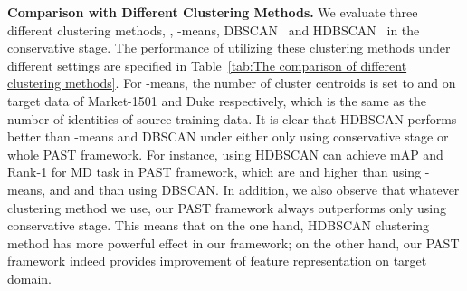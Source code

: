 \documentclass[10pt,twocolumn,letterpaper]{article}
\begin{document}
\textbf{Comparison with Different Clustering Methods.} We evaluate three different clustering methods, \ie,  -means, DBSCAN~\cite{DBSCAN} and HDBSCAN~\cite{HDBSCAN} in the conservative stage. The performance of utilizing these clustering methods under different settings are specified in Table~\ref{tab:The comparison of different clustering methods}. For -means, the number of cluster centroids  is set to  and  on target data of Market-1501 and Duke respectively, which is the same as the number of identities of source training data.
It is clear that HDBSCAN performs better than -means and DBSCAN under either only using conservative stage or whole PAST framework. For instance, using HDBSCAN can achieve mAP  and Rank-1  for MD task in PAST framework, which are  and  higher than using -means, and  and  than using DBSCAN. In addition, we also observe that whatever clustering method we use, our PAST framework always outperforms only using conservative stage. This means that on the one hand, HDBSCAN clustering method has more powerful effect in our framework; on the other hand, our PAST framework indeed provides improvement of feature representation on target domain.
\end{document}
